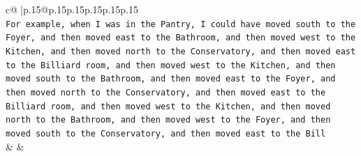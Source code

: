 \documentclass{article}
\begin{document}
{\begin{supertabular}{c@{$\;$}|p{.15\linewidth}@{}p{.15\linewidth}p{.15\linewidth}p{.15\linewidth}p{.15\linewidth}p{.15\linewidth}}
{{{\\ 
\texttt{For example, when I was in the Pantry, I could have moved south to the Foyer, and then moved east to the Bathroom, and then moved west to the Kitchen, and then moved north to the Conservatory, and then moved east to the Billiard room, and then moved west to the Kitchen, and then moved south to the Bathroom, and then moved east to the Foyer, and then moved north to the Conservatory, and then moved east to the Billiard room, and then moved west to the Kitchen, and then moved north to the Bathroom, and then moved west to the Foyer, and then moved south to the Conservatory, and then moved east to the Bill} \\
            }
        }
    }
    & & \\ \\

\end{supertabular}
}
\end{document}
